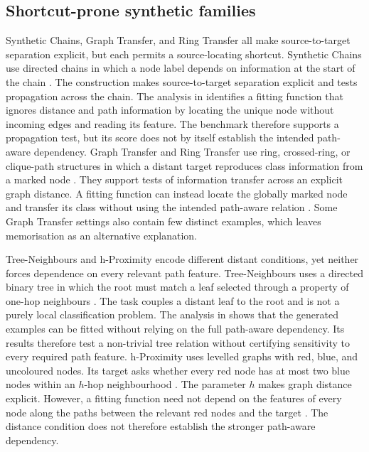 \subsection{Shortcut-prone synthetic families}
\label{sec:sota-synthetic-benchmarks}

Synthetic Chains, Graph Transfer, and Ring Transfer all make source-to-target separation explicit, but each permits a source-locating shortcut.
Synthetic Chains use directed chains in which a node label depends on information at the start of the chain \cite{gu2020implicit}.
The construction makes source-to-target separation explicit and tests propagation across the chain.
The analysis in \cite{zhou2025glora} identifies a fitting function that ignores distance and path information by locating the unique node without incoming edges and reading its feature.
The benchmark therefore supports a propagation test, but its score does not by itself establish the intended path-aware dependency.
Graph Transfer and Ring Transfer use ring, crossed-ring, or clique-path structures in which a distant target reproduces class information from a marked node \cite{digionvanni2023oversquashing,gutteridge2023drew}.
They support tests of information transfer across an explicit graph distance.
A fitting function can instead locate the globally marked node and transfer its class without using the intended path-aware relation \cite{zhou2025glora}.
Some Graph Transfer settings also contain few distinct examples, which leaves memorisation as an alternative explanation.

Tree-Neighbours and h-Proximity encode different distant conditions, yet neither forces dependence on every relevant path feature.
Tree-Neighbours uses a directed binary tree in which the root must match a leaf selected through a property of one-hop neighbours \cite{alon2021bottleneck}.
The task couples a distant leaf to the root and is not a purely local classification problem.
The analysis in \cite{zhou2025glora} shows that the generated examples can be fitted without relying on the full path-aware dependency.
Its results therefore test a non-trivial tree relation without certifying sensitivity to every required path feature.
h-Proximity uses levelled graphs with red, blue, and uncoloured nodes.
Its target asks whether every red node has at most two blue nodes within an $h$-hop neighbourhood \cite{abboud2022shortest}.
The parameter $h$ makes graph distance explicit.
However, a fitting function need not depend on the features of every node along the paths between the relevant red nodes and the target \cite{zhou2025glora}.
The distance condition does not therefore establish the stronger path-aware dependency.

